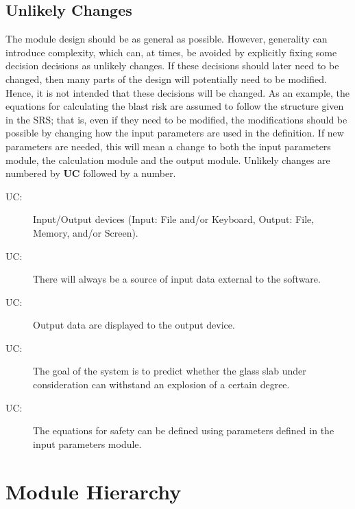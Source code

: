 \documentclass[12pt]{article}
\newcounter{ucnum}
\newcommand{\uctheucnum}{UC\theucnum}
\begin{document}
\begin{description}
\end{description}

\subsection{Unlikely Changes} \label{SecUchange}

The module design should be as general as possible. However, generality can introduce complexity, which can, at times, be avoided by explicitly fixing some decision decisions as unlikely changes. If
these decisions should later need to be changed, then many parts of the design
will potentially need to be modified. Hence, it is not intended that these
decisions will be changed.  As an example, the equations for calculating the 
blast risk  are assumed to follow the structure given in the SRS; that is,
even if they need to be modified, the modifications should be possible by
changing how the input parameters are used in the definition.  If new parameters
are needed, this will mean a change to both the input parameters module, the
calculation module and the output module.
 Unlikely changes are numbered by \textbf{UC}
followed by a number.

\begin{description}
\item[ \uctheucnum \label{ucIO}:] Input/Output devices
  (Input: File and/or Keyboard, Output: File, Memory, and/or Screen).
\item[ \uctheucnum \label{ucInput}:] There will always be
  a source of input data external to the software.
\item[ \uctheucnum \label{ucOutput}:] Output data are
  displayed to the output device.
\item[ \uctheucnum \label{ucGoal}:] The goal of the system
  is to predict whether the glass slab under consideration can withstand an 
  explosion of a certain degree.
\item[ \uctheucnum \label{ucODEstructure}:] The 
equations for safety can be defined using parameters defined in the input parameters 
module.

\end{description}

\section{Module Hierarchy} \label{SecMH}
\end{document}
